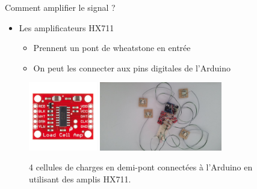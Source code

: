 \documentclass{beamer}
\begin{document}
\begin{frame}
\begin{block}{Comment amplifier le signal ?}
\begin{itemize}
\item Les amplificateurs HX711
\begin{itemize}
\item Prennent un pont de wheatstone en entrée
\item On peut les connecter aux pins digitales de l'Arduino
\end{itemize}
\end{itemize}

\begin{figure}
\begin{center}
\includegraphics[height=3cm]{images/HX711.jpg}
\includegraphics[height=3cm]{images/load_sensor_connected.jpg}
\end{center}
\caption{4 cellules de charges en demi-pont connectées à l'Arduino en utilisant des amplis HX711.}
\label{fig:load_sensor_connected}
\end{figure}
\end{block}
\end{frame}
\end{document}
